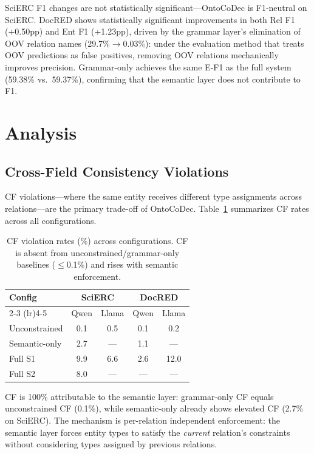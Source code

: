 \documentclass[11pt,a4paper]{article}
\newcommand{\method}{OntoCoDec}
\begin{document}
SciERC F1 changes are not statistically significant---\method{} is F1-neutral on SciERC. DocRED shows statistically significant improvements in both Rel F1 (+0.50pp) and Ent F1 (+1.23pp), driven by the grammar layer's elimination of OOV relation names (29.7\%$\to$0.03\%): under the evaluation method that treats OOV predictions as false positives, removing OOV relations mechanically improves precision. Grammar-only achieves the same E-F1 as the full system (59.38\% vs.\ 59.37\%), confirming that the semantic layer does not contribute to F1.

\section{Analysis}
\label{sec:analysis}

\subsection{Cross-Field Consistency Violations}
\label{sec:cf_analysis}

CF violations---where the same entity receives different type assignments across relations---are the primary trade-off of \method{}. Table~\ref{tab:cf_summary} summarizes CF rates across all configurations.

\begin{table}[t]
\centering
\small
\caption{CF violation rates (\%) across configurations. CF is absent from unconstrained/grammar-only baselines ($\leq$0.1\%) and rises with semantic enforcement.}
\label{tab:cf_summary}
\begin{tabular}{lcccc}
\toprule
\textbf{Config} & \multicolumn{2}{c}{\textbf{SciERC}} & \multicolumn{2}{c}{\textbf{DocRED}} \\
\cmidrule(lr){2-3} \cmidrule(lr){4-5}
 & Qwen & Llama & Qwen & Llama \\
\midrule
Unconstrained   & 0.1 & 0.5 & 0.1 & 0.2 \\
Semantic-only   & 2.7 & --- & 1.1 & --- \\
Full S1         & 9.9 & 6.6 & 2.6 & 12.0 \\
Full S2         & 8.0 & --- & --- & --- \\
\bottomrule
\end{tabular}
\end{table}

CF is 100\% attributable to the semantic layer: grammar-only CF equals unconstrained CF (0.1\%), while semantic-only already shows elevated CF (2.7\% on SciERC). The mechanism is per-relation independent enforcement: the semantic layer forces entity types to satisfy the \emph{current} relation's constraints without considering types assigned by previous relations.
\end{document}
